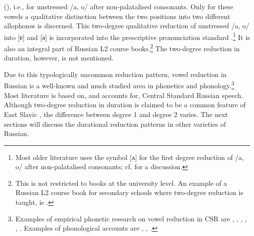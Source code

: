 \documentclass[output=paper]{langscibook}
\begin{document}
(\citealt{Zlatoustova1981, BondarkoEtAl1966}), i.e., for unstressed /a, o/ after non-palatalised consonants. Only for these vowels a qualitative distinction between the two positions into two different allophones is discerned. This two-degree qualitative reduction of unstressed /a, o/ into [ɐ] and [ә] is incorporated into the prescriptive pronunciation standard \citep{Avanesov1984}.\footnote{Most older literature uses the symbol [ʌ] for the first degree reduction of /a, o/ after non-palatalised consonants; cf. \citet{Iosad2012} for a discussion.} It is also an integral part of Russian L2 course books.\footnote{This is not restricted to books at the university level. An example of a Russian L2 course book for secondary schools where two-degree reduction is taught, is \citet{HertzEtAl2005}.} The two-degree reduction in duration, however, is not mentioned.



Due to this typologically uncommon reduction pattern, vowel reduction in Russian is a well-known and much studied area in phonetics and phonology.\footnote{Examples of empirical phonetic research on vowel reduction in CSR are \citet{Zlatoustova1981}, \citet{BondarkoEtAl1966}, \citet{Kuznecov1997}, \citet{PadgettTabain2005}, \citet{Barnes2006}, \citet{KocharovEtAl2015}. Examples of phonological accounts are \citet{Crosswhite2000}, \citet{Iosad2012}, \citet{Mołczanow2015}.} Most literature is based on, and accounts for, Central Standard Russian speech. Although two-degree reduction in duration is claimed to be a common feature of East Slavic \citep{Dubina2012}, the difference between degree 1 and degree 2 varies. The next sections will discuss the durational reduction patterns in other varieties of Russian.
\end{document}
